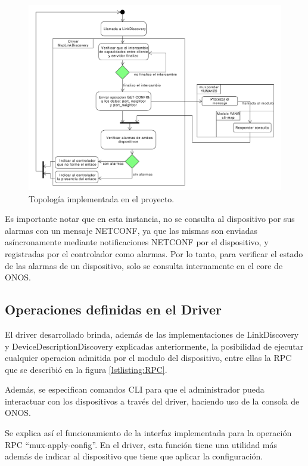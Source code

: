 \begin{figure}[!h]
    \centering
    \includegraphics[scale=0.45]{Figures/actividad_link.pdf}
    \caption{Topología implementada en el proyecto.}
    \label{fig:actividad_link}
  \end{figure}

  Es importante notar que en esta instancia, no se consulta al dispositivo por sus alarmas con un mensaje NETCONF, ya que las mismas son enviadas asíncronamente mediante notificaciones NETCONF por el dispositivo, y registradas por el controlador como alarmas. Por lo tanto, para verificar el estado de las alarmas de un dispositivo, solo se consulta internamente en el core de ONOS.

  \subsection{Operaciones definidas en el Driver}

  El driver desarrollado brinda, además de las implementaciones de LinkDiscovery y DeviceDescriptionDiscovery explicadas anteriormente, la posibilidad de ejecutar cualquier operacion admitida por el modulo del dispositivo, entre ellas la RPC que se describió en la figura \ref{lstlisting:RPC}. 
  
  Además, se especifican comandos CLI para que el administrador pueda interactuar con los dispositivos a través del driver, haciendo uso de la consola de ONOS. 

  Se explica así el funcionamiento de la interfaz implementada para la operación RPC “mux-apply-config”. En el driver, esta función tiene una utilidad más además de indicar al dispositivo que tiene que aplicar la configuración. 

